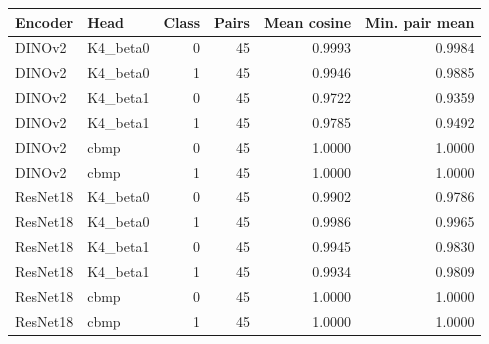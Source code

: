 \begingroup\small\setlength{\tabcolsep}{4pt}
\begin{longtable}{llrrrr}
\toprule
Encoder & Head & Class & Pairs & Mean cosine & Min. pair mean \\ \midrule
DINOv2 & K4\_beta0 & 0 & 45 & 0.9993 & 0.9984 \\
DINOv2 & K4\_beta0 & 1 & 45 & 0.9946 & 0.9885 \\
DINOv2 & K4\_beta1 & 0 & 45 & 0.9722 & 0.9359 \\
DINOv2 & K4\_beta1 & 1 & 45 & 0.9785 & 0.9492 \\
DINOv2 & cbmp & 0 & 45 & 1.0000 & 1.0000 \\
DINOv2 & cbmp & 1 & 45 & 1.0000 & 1.0000 \\
ResNet18 & K4\_beta0 & 0 & 45 & 0.9902 & 0.9786 \\
ResNet18 & K4\_beta0 & 1 & 45 & 0.9986 & 0.9965 \\
ResNet18 & K4\_beta1 & 0 & 45 & 0.9945 & 0.9830 \\
ResNet18 & K4\_beta1 & 1 & 45 & 0.9934 & 0.9809 \\
ResNet18 & cbmp & 0 & 45 & 1.0000 & 1.0000 \\
ResNet18 & cbmp & 1 & 45 & 1.0000 & 1.0000 \\
\bottomrule\end{longtable}\endgroup

